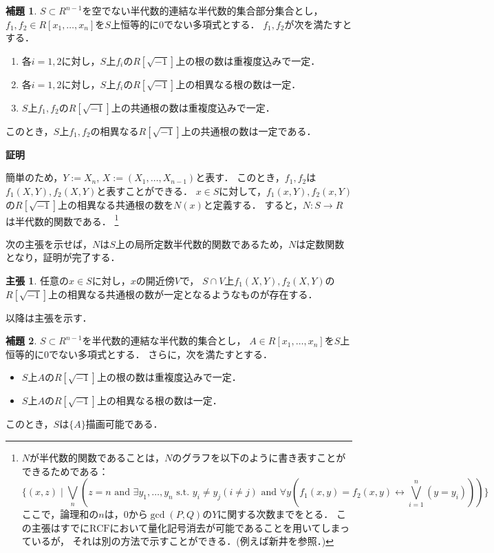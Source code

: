 \documentclass[uplatex, dvipdfmx]{jsarticle}
\makeatletter
\renewenvironment{proof}[1][\proofname]{\par
  \pushQED{\qed}%
  \normalfont \topsep6\p@\@plus6\p@\relax
  \trivlist
  \item\relax
  {\bfseries
  #1\@addpunct{.}}\hspace\labelsep\ignorespaces
}{%
  \popQED\endtrivlist\@endpefalse
}
\newcommand{\RCF}{\mathrm{RCF}}
\newcommand{\map}[3]{{#1}:{#2}\rightarrow{#3}}
\theoremstyle{definition}
\newtheorem{lemma}{補題}[section]
\newtheorem*{claim*}{主張}
\renewcommand{\proofname}{\textbf{証明}}
\makeatother
\begin{document}
\begin{lemma}\label{lemma:del_1}
     $S \subset R^{n-1}$を空でない半代数的連結な半代数的集合部分集合とし，
     $f_1, f_2 \in R[x_1, \dots, x_n]$を$S$上恒等的に$0$でない多項式とする．
     $f_1, f_2$が次を満たすとする．
     \begin{enumerate}
          \item 各$i=1, 2$に対し，$S$上$f_i$の$R[\sqrt{-1}]$上の根の数は重複度込みで一定．
          \item 各$i=1, 2$に対し，$S$上$f_i$の$R[\sqrt{-1}]$上の相異なる根の数は一定．
          \item $S$上$f_1, f_2$の$R[\sqrt{-1}]$上の共通根の数は重複度込みで一定．
     \end{enumerate}
     このとき，$S$上$f_1, f_2$の相異なる$R[\sqrt{-1}]$上の共通根の数は一定である．
\end{lemma}
\begin{proof}
     簡単のため，$Y:=X_n$, $X:=(X_1, \dots, X_{n-1})$と表す．
     このとき，$f_1, f_2$は$f_1(X,Y), f_2(X,Y)$と表すことができる．
     $x \in S$に対して，$f_1(x,Y), f_2(x,Y)$の$R[\sqrt{-1}]$上の相異なる共通根の数を$N(x)$と定義する．
     すると，$\map{N}{S}{R}$は半代数的関数である．
     \footnote{$N$が半代数的関数であることは，$N$のグラフを以下のように書き表すことができるためである：
     \[
          \{(x,z) \mid \bigvee_{n}(z = n \text{ and } \exists y_1, \dots, y_n \text{ s.t. } y_i \neq y_j( i\neq j) \text{ and } \forall y(f_1(x,y)=f_2(x,y) \leftrightarrow \bigvee_{i=1}^n (y = y_i)))\}
     \]
     ここで，論理和の$n$は，$0$から$\gcd(P,Q)$の$Y$に関する次数までをとる．
     この主張はすでに$\RCF$において$量化記号消去$が可能であることを用いてしまっているが，
     それは別の方法で示すことができる．(例えば新井\cite{Arai}を参照．)
     }

     次の主張を示せば，$N$は$S$上の局所定数半代数的関数であるため，$N$は定数関数となり，証明が完了する．
     \begin{claim*}
          任意の$x \in S$に対し，$x$の開近傍$V$で，
          $S\cap V$上$f_1(X,Y), f_2(X,Y)$の$R[\sqrt{-1}]$上の相異なる共通根の数が一定となるようなものが存在する．
     \end{claim*}
     以降は主張を示す．
\end{proof}

\begin{lemma}\label{lemma:del_2}
     $S \subset R^{n-1}$を半代数的連結な半代数的集合とし，     
     $A \in R[x_1, \dots, x_n]$を$S$上恒等的に$0$でない多項式とする．
     さらに，次を満たすとする．
     \begin{itemize}
          \item $S$上$A$の$R[\sqrt{-1}]$上の根の数は重複度込みで一定．
          \item $S$上$A$の$R[\sqrt{-1}]$上の相異なる根の数は一定．
     \end{itemize}
     このとき，$S$は$\{A\}$描画可能である．
\end{lemma}
\end{document}
